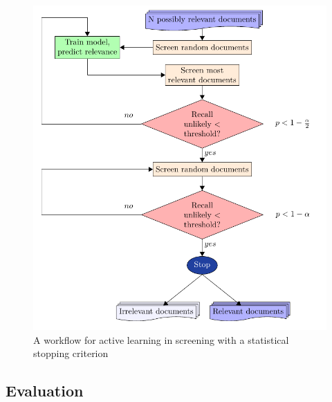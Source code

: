 \documentclass{bmcart}
\begin{document}
	
	\medskip
	
	
	
	\begin{figure}
		\includegraphics[width=0.7\linewidth]{2_figs_flow.pdf}
		\caption{A workflow for active learning in screening with a statistical stopping criterion}
		\label{flow}
	\end{figure}
	
	\subsection*{Evaluation}
	
\end{document}
